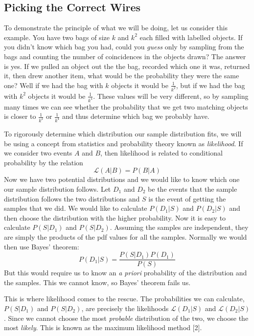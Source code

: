 \documentclass[12pt]{article}
\theoremstyle{definition}
\theoremstyle{remark}
\theoremstyle{remark}
\begin{document}
\subsection{Picking the Correct Wires}
\par
To demonstrate the principle of what we will be doing, let us consider this example. You have two bags of size $k$ and $k^2$ each filled with labelled objects. If you didn't know which bag you had, could you \emph{guess} only by sampling from the bags and counting the number of coincidences in the objects drawn? The answer is yes. If we pulled an object out the the bag, recorded which one it was, returned it, then drew another item, what would be the probability they were the same one? Well if we had the bag with $k$ objects it would be $\frac{1}{k^2}$, but if we had the bag with $k^2$ objects it would be $\frac{1}{k^4}$. These values will be very different, so by sampling many times we can see whether the probability that we get two matching objects is closer to $\frac{1}{k^2}$ or $\frac{1}{k^4}$ and thus determine which bag we probably have.

\par
To rigorously determine which distribution our sample distribution fits, we will be using a concept from statistics and probability theory known as \emph{likelihood}. If we consider two events $A$ and $B$, then likelihood is related to conditional probability by the relation 
\[ \mathcal{L}(A|B)=P(B|A)\]
Now we have two potential distributions and we would like to know which one our sample distribution follows. Let $D_1$ and $D_2$ be the events that the sample distribution follows the two distributions and $S$ is the event of getting the samples that we did. We would like to calculate $P( D_1 |S)$ and $P( D_2 | S)$ and then choose the distribution with the higher probability. Now it is easy to calculate $P(S | D_1 )$ and $P(S | D_2 )$. Assuming the samples are independent, they are simply the products of the pdf values for all the samples. Normally we would then use Bayes' theorem:
\[ P(D_1 | S) = \frac{P(S | D_1) P(D_1)}{P(S)} \]
But this would require us to know an \emph{a priori} probability of the distribution and the samples. This we cannot know, so Bayes' theorem fails us. 

\par
This is where likelihood comes to the rescue. The probabilities we can calculate, $P( S | D_1)$ and $P( S | D_2 )$, are precisely the likelihoods $\mathcal{L}(D_1 | S)$ and $\mathcal{L}(D_2 | S)$. Since we cannot choose the most \emph{probable} distribution of the two, we choose the most \emph{likely}. This is known as the maximum likelihood method [2].
\end{document}
